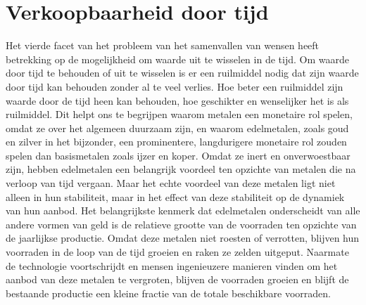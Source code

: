\hypertarget{verkoopbaarheid-door-tijd}{%
\section{Verkoopbaarheid door tijd}\label{verkoopbaarheid-door-tijd}}

Het vierde facet van het probleem van het samenvallen van wensen heeft betrekking op de mogelijkheid om waarde uit te wisselen in de tijd. Om waarde door tijd te behouden of uit te wisselen is er een ruilmiddel nodig dat zijn waarde door tijd kan behouden zonder al te veel verlies. Hoe beter een ruilmiddel zijn waarde door de tijd heen kan behouden, hoe geschikter en wenselijker het is als ruilmiddel. Dit helpt ons te begrijpen waarom metalen een monetaire rol spelen, omdat ze over het algemeen duurzaam zijn, en waarom edelmetalen, zoals goud en zilver in het bijzonder, een prominentere, langdurigere monetaire rol zouden spelen dan basismetalen zoals ijzer en koper. Omdat ze inert en onverwoestbaar zijn, hebben edelmetalen een belangrijk voordeel ten opzichte van metalen die na verloop van tijd vergaan. Maar het echte voordeel van deze metalen ligt niet alleen in hun stabiliteit, maar in het effect van deze stabiliteit op de dynamiek van hun aanbod. Het belangrijkste kenmerk dat edelmetalen onderscheidt van alle andere vormen van geld is de relatieve grootte van de voorraden ten opzichte van de jaarlijkse productie. Omdat deze metalen niet roesten of verrotten, blijven hun voorraden in de loop van de tijd groeien en raken ze zelden uitgeput. Naarmate de technologie voortschrijdt en mensen ingenieuzere manieren vinden om het aanbod van deze metalen te vergroten, blijven de voorraden groeien en blijft de bestaande productie een kleine fractie van de totale beschikbare voorraden.

